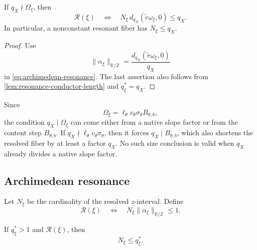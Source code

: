 \begin{corollary}
\label{cor:literal-resonance-test}
If \(q_X\nmid\Omega_\xi\), then
\begin{equation}
 \mathcal R(\xi)
 \quad\Longleftrightarrow\quad
 N_\xi\,d_{q_X}(\widetilde r\omega_\xi,0)\le q_X.
\label{eq:literal-resonance-test}
\end{equation}
In particular, a nonconstant resonant fiber has \(N_\xi\le q_X\).
\end{corollary}

\begin{proof}
Use
\[
 \|\alpha_\xi\|_{\mathbb R/\mathbb Z}
 =
 \frac{d_{q_X}(\widetilde r\omega_\xi,0)}{q_X}
\]
in \eqref{eq:archimedean-resonance}.  The last assertion also follows
from \cref{lem:resonance-conductor-length} and
\(q_\xi^\ast=q_X\).
\end{proof}

\begin{remark}
Since
\[
 \Omega_\xi=\ell_\theta v_\theta\sigma_\theta B_{\theta,b},
\]
the condition \(q_X\mid\Omega_\xi\) can come either from a native
slope factor or from the content step \(B_{\theta,b}\).  If
\(q_X\nmid\ell_\theta v_\theta\sigma_\theta\), then it forces
\(q_X\mid B_{\theta,b}\), which also shortens the resolved fiber by
at least a factor \(q_X\).  No such size conclusion is valid when
\(q_X\) already divides a native slope factor.
\end{remark}

\subsection{Archimedean resonance}

Let \(N_\xi\) be the cardinality of the resolved \(z\)-interval.
Define
\begin{equation}
 \mathcal R(\xi)
 \quad\Longleftrightarrow\quad
 N_\xi\|\alpha_\xi\|_{\mathbb R/\mathbb Z}\le1.
\label{eq:archimedean-resonance}
\end{equation}

\begin{lemma}
\label{lem:resonance-conductor-length}
If \(q_\xi^\ast>1\) and \(\mathcal R(\xi)\), then
\begin{equation}
 N_\xi\le q_\xi^\ast.
\label{eq:resonance-length-bound}
\end{equation}
\end{lemma}

